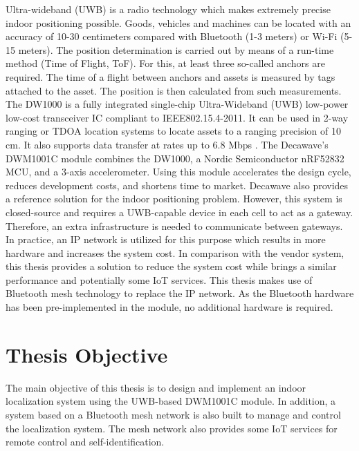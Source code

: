 \documentclass[\main/thesis.tex]{subfiles}
\begin{document}
Ultra-wideband (UWB) is a radio technology which makes extremely precise indoor positioning possible. Goods, vehicles and machines can be located with an accuracy of 10-30 centimeters compared with Bluetooth (1-3 meters) or Wi-Fi (5-15 meters). The position determination is carried out by means of a run-time method (Time of Flight, ToF). For this, at least three so-called anchors are required. The time of a flight between anchors and assets is measured by tags attached to the asset. The position is then calculated from such measurements.
\newline\newline
The DW1000 is a fully integrated single-chip Ultra-Wideband (UWB) low-power low-cost transceiver IC compliant to IEEE802.15.4-2011. It can be used in 2-way ranging or TDOA location systems to locate assets to a ranging precision of 10 cm. It also supports data transfer at rates up to 6.8 Mbps \cite{decawave:dw1000_datasheet}.
\newline\newline
The Decawave's DWM1001C module combines the DW1000, a Nordic Semiconductor nRF52832 MCU, and a 3-axis accelerometer. Using this module accelerates the design cycle, reduces development costs, and shortens time to market.
\newline\newline
Decawave also provides a reference solution for the indoor positioning problem. However, this system is closed-source and requires a UWB-capable device in each cell to act as a gateway. Therefore, an extra infrastructure is needed to communicate between gateways. In practice, an IP network is utilized for this purpose which results in more hardware and increases the system cost.
In comparison with the vendor system, this thesis provides a solution to reduce the system cost while brings a similar performance and potentially some IoT services. This thesis makes use of Bluetooth mesh technology to replace the IP network. As the Bluetooth hardware has been pre-implemented in the module, no additional hardware is required.

\section{Thesis Objective}
The main objective of this thesis is to design and implement an indoor localization system using the UWB-based DWM1001C module. In addition, a system based on a Bluetooth mesh network is also built to manage and control the localization system. The mesh network also provides some IoT services for remote control and self-identification.
\end{document}

